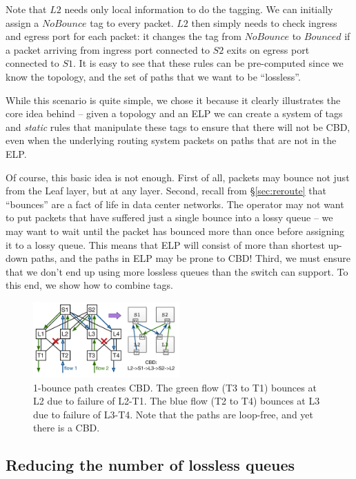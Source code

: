 Note that $L2$ needs only local information to do the tagging. We can initially
assign a $NoBounce$ tag to every packet. $L2$ then simply needs to check ingress
and egress port for each packet: it changes the tag from $NoBounce$ to $Bounced$
if a packet arriving from ingress port connected to $S2$ exits on egress port
connected to $S1$.  It is easy to see that these rules can be pre-computed since
we know the topology, and the set of  paths that we want to be ``lossless''.

While this scenario is quite simple, we chose it because it clearly illustrates
the core idea behind \sysname{} -- given a topology and an ELP we can create a
system of tags and {\em static} rules that manipulate these tags to ensure that
there will not be CBD, even when the underlying routing system packets on paths
that are not in the ELP.

Of course, this basic idea is not enough. First of all, packets may bounce not
just from the Leaf layer, but at any layer. Second, recall from
\S\ref{sec:reroute} that ``bounces'' are a fact of life in data center networks.
The operator may not want to put packets that have suffered just a single bounce
into a lossy queue -- we may want to wait until the packet has bounced more than
once before assigning it to a lossy queue. This means that ELP will consist
of more than shortest up-down paths, and the paths in ELP may be prone to CBD!
Third, we must ensure that we don't end up using more lossless queues than the
switch can support. To this end, we show how to combine tags.

\begin{figure}[t]
	\centering
	\includegraphics[width=0.5\textwidth] {figs/cbd_a}
		\caption{1-bounce path creates CBD. The green flow (T3 to T1) bounces at L2 due to failure
		of L2-T1. The blue flow (T2 to T4) bounces at L3 due to failure of
		L3-T4. Note that the paths are loop-free, and yet there is a CBD.}
	\label{fig:clos_1_bounce}
\end{figure}

\subsection{Reducing the number of lossless queues}
\label{subsec:combine}

